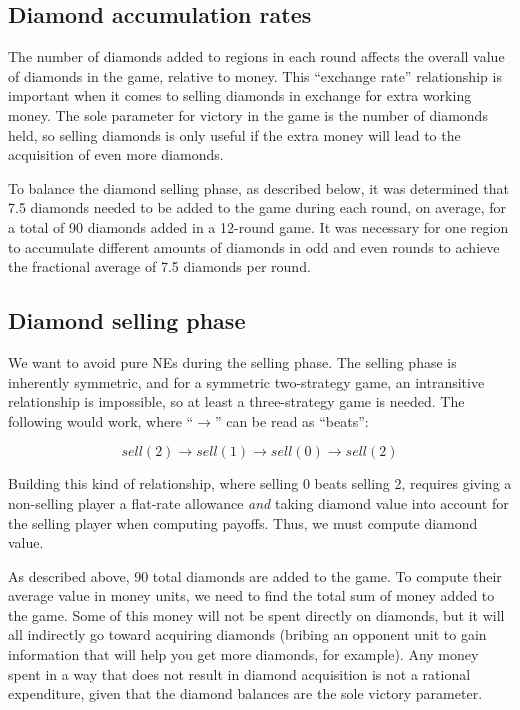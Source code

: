 \documentclass[12pt]{article}
\begin{document}
\subsection{Diamond accumulation rates}
The number of diamonds added to regions in each round affects the overall value of diamonds in the game, relative to money.  This ``exchange rate'' relationship is important when it comes to selling diamonds in exchange for extra working money.  The sole parameter for victory in the game is the number of diamonds held, so selling diamonds is only useful if the extra money will lead to the acquisition of even more diamonds.

To balance the diamond selling phase, as described below, it was determined that 7.5 diamonds needed to be added to the game during each round, on average, for a total of 90 diamonds added in a 12-round game.  It was necessary for one region to accumulate different amounts of diamonds in odd and even rounds to achieve the fractional average of 7.5 diamonds per round.


\subsection{Diamond selling phase}
We want to avoid pure NEs during the selling phase.  The selling phase is inherently symmetric, and for a symmetric two-strategy game, an intransitive relationship is impossible, so at least a three-strategy game is needed.  The following would work, where ``$\longrightarrow$'' can be read as ``beats'':

\[ sell(2) \longrightarrow sell(1) \longrightarrow sell(0) \longrightarrow sell(2)
\]

Building this kind of relationship, where selling 0 beats selling 2, requires giving a non-selling player a flat-rate allowance {\it and} taking diamond value into account for the selling player when computing payoffs.  Thus, we must compute diamond value.

As described above, 90 total diamonds are added to the game.  To compute their average value in money units, we need to find the total sum of money added to the game.  Some of this money will not be spent directly on diamonds, but it will all indirectly go toward acquiring diamonds (bribing an opponent unit to gain information that will help you get more diamonds, for example).  Any money spent in a way that does not result in diamond acquisition is not a rational expenditure, given that the diamond balances are the sole victory parameter.
\end{document}
